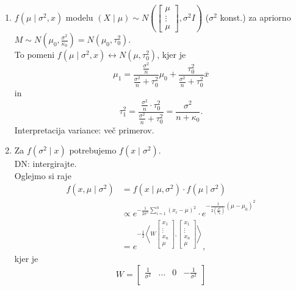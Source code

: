 \documentclass[a4paper, 12pt]{book}
\theoremstyle{definition}
\theoremstyle{remark}
\begin{document}
\begin{enumerate}[label=(\roman*)]
  \item $f(\mu \mid \sigma^2, x)$  modelu $(X \mid \mu) \sim
    N\left(\begin{bmatrix}\mu\\\vdots\\\mu\end{bmatrix}, \sigma^2 I\right)$ ($\sigma^2$ konst.) za apriorno
    $M \sim N\left(\mu_0, \frac{\sigma^2}{\kappa_0}\right) = N(\mu_0, \tau_0^2)$. \\
    To pomeni $f(\mu \mid \sigma^2, x) \leftrightarrow N(\mu, \tau_0^2)$, kjer je
    \begin{equation*}
      \mu_1 = \frac{\frac{\sigma^2}{n}}{\frac{\sigma^2}{n} + \tau_0^2} \mu_0 + \frac{\tau_0^2}{\frac{\sigma^2}{n} + \tau_0^2} \overline{x}
    \end{equation*}
    in
    \begin{equation*}
      \tau_1^2 = \frac{\frac{\sigma^2}{n} \cdot \tau_0^2}{\frac{\sigma^2}{n} + \tau_0^2} = \frac{\sigma^2}{n + \kappa_0}.
    \end{equation*}
    Interpretacija variance: več primerov.
  \item Za $f(\sigma^2 \mid x)$ potrebujemo $f(x \mid \sigma^2)$. \\
    DN: intergirajte. \\
    Oglejmo si raje
    \begin{align*}
      f(x, \mu \mid \sigma^2) &= f(x \mid \mu, \sigma^2) \cdot f(\mu \mid \sigma^2) \\
      &\propto e^{-\frac{1}{2\sigma^2} \sum_{i=1}^{n} (x_i - \mu)^2} \cdot
        e^{-\frac{1}{2 \left(\frac{\sigma^2}{\kappa_0}\right)} (\mu - \mu_0)^2} \\
      &= e^{-\frac{1}{2} \left\langle W \begin{bmatrix}x_1\\\vdots\\x_n\\\mu\end{bmatrix},
        \begin{bmatrix}x_1\\\vdots\\x_n\\\mu\end{bmatrix} \right\rangle},
    \end{align*}
    kjer je
    \begin{equation*}
      W = \begin{bmatrix}
        \frac{1}{\sigma^2} & \dots & 0 & -\frac{1}{\sigma^2} \\

\end{bmatrix}
\end{equation*}
\end{enumerate}
\end{document}
